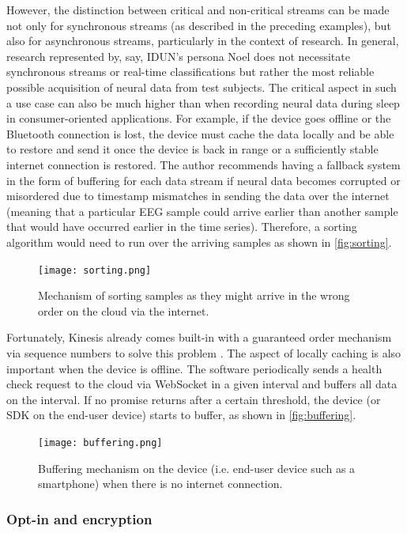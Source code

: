 However, the distinction between critical and non-critical streams can be made not only for synchronous streams (as described in the preceding examples), but also for asynchronous streams, particularly in the context of research. In general, research represented by, say, IDUN’s persona Noel does not necessitate synchronous streams or real-time classifications but rather the most reliable possible acquisition of neural data from test subjects. The critical aspect in such a use case can also be much higher than when recording neural data during sleep in consumer-oriented applications. For example, if the device goes offline or the Bluetooth connection is lost, the device must cache the data locally and be able to restore and send it once the device is back in range or a sufficiently stable internet connection is restored. The author recommends having a fallback system in the form of buffering for each data stream if neural data becomes corrupted or misordered due to timestamp mismatches in sending the data over the internet (meaning that a particular EEG sample could arrive earlier than another sample that would have occurred earlier in the time series). Therefore, a sorting algorithm would need to run over the arriving samples as shown in \autoref{fig:sorting}.

\begin{figure}[!ht]
  \centering
  \texttt{[image: sorting.png]}
  \caption{Mechanism of sorting samples as they might arrive in the wrong order on the cloud via the internet.}
  \label{fig:sorting}
\end{figure}

Fortunately, Kinesis already comes built-in with a guaranteed order mechanism via sequence numbers to solve this problem \citep{amazon_web_services_inc_amazon_nodate}. The aspect of locally caching is also important when the device is offline. The software periodically sends a health check request to the cloud via WebSocket in a given interval and buffers all data on the interval. If no promise returns after a certain threshold, the device (or SDK on the end-user device) starts to buffer, as shown in \autoref{fig:buffering}.

\begin{figure}[!ht]
  \centering
  \texttt{[image: buffering.png]}
  \caption{Buffering mechanism on the device (i.e. end-user device such as a smartphone) when there is no internet connection.}
  \label{fig:buffering}
\end{figure}

\subsubsection{Opt-in and encryption}
\label{chapter5-opt-in-and-encryption}


